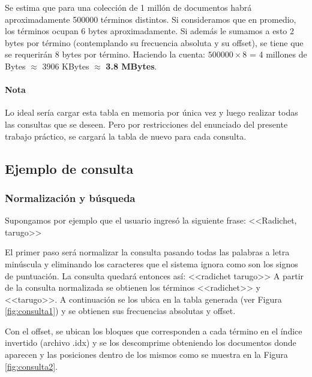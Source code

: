 Se estima que para una colección de 1 millón de documentos habrá aproximadamente 500000 términos distintos. Si consideramos que en promedio, los términos ocupan 6 bytes aproximadamente. Si además le sumamos a esto 2 bytes por término (contemplando su frecuencia absoluta y su offset), se tiene que se requerirán 8 bytes por término. Haciendo la cuenta: $500000 \times 8$ = 4 millones de Bytes $\approx$ 3906 KBytes $\approx$ \textbf{3.8 MBytes}.

\paragraph{Nota} Lo ideal sería cargar esta tabla en memoria por única vez y luego realizar todas las consultas que se deseen. Pero por restricciones del enunciado del presente trabajo práctico, se cargará la tabla de nuevo para cada consulta.

\subsection{Ejemplo de consulta}

\subsubsection{Normalización y búsqueda}

Supongamos por ejemplo que el usuario ingresó la siguiente frase: <<Radichet, tarugo>>

El primer paso será normalizar la consulta pasando todas las palabras a letra minúscula y eliminando los caracteres que el sistema ignora como son los signos de puntuación. La consulta quedará entonces así: <<radichet tarugo>>
A partir de la consulta normalizada se obtienen los términos <<radichet>> y <<tarugo>>. 
A continuación se los ubica en la tabla generada (ver Figura \ref{fig:consulta1}) y se obtienen sus frecuencias absolutas y offset.


Con el offset, se ubican los bloques que corresponden a cada término en el índice invertido (archivo .idx) y se los descomprime obteniendo los documentos donde aparecen y las posiciones dentro de los mismos como se muestra en la Figura \ref{fig:consulta2}.


